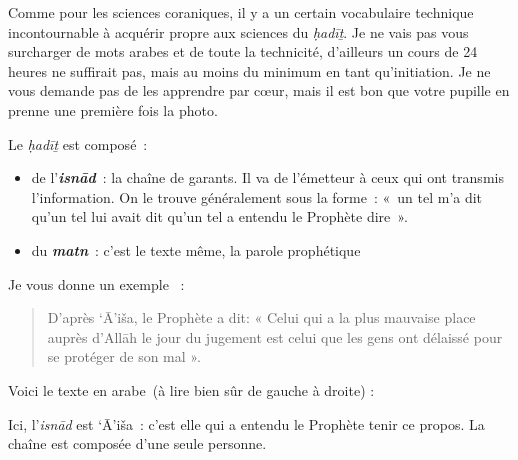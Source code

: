 Comme pour les sciences coraniques, il y a un certain vocabulaire
technique incontournable à acquérir propre aux sciences du \emph{ḥadīṯ}.
Je ne vais pas vous surcharger de mots arabes et de toute la technicité,
d'ailleurs un cours de 24 heures ne suffirait pas, mais au moins du
minimum en tant qu'initiation. Je ne vous demande pas de les apprendre
par cœur, mais il est bon que votre pupille en prenne une première fois
la photo.


\begin{Def}
Le \emph{ḥadīṯ} est composé~:

\begin{itemize}
\item
  de l'\emph{\textbf{isnād}}~: la chaîne de garants. Il va de l'émetteur
  à ceux qui ont transmis l'information. On le trouve généralement sous
  la forme~: «~un tel m'a dit qu'un tel lui avait dit qu'un tel a
  entendu le Prophète dire~».
\item
  du \emph{\textbf{matn}}~: c'est le texte même, la parole prophétique
\end{itemize}
\end{Def}


Je vous donne un exemple~ :

\begin{quote}
    D'après `Ā'iša, le Prophète a dit: « Celui qui a la plus mauvaise place
auprès d'Allāh le jour du jugement est celui que les gens ont délaissé
pour se protéger de son mal ».\\
\end{quote}



Voici le texte en arabe~(à lire bien sûr de gauche à droite) :
\begin{quote}
    

\end{quote}
Ici, l'\emph{isnād} est `Ā'iša~: c'est elle qui a entendu le Prophète
tenir ce propos. La chaîne est composée d'une seule personne.

